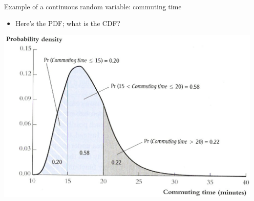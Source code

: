 \documentclass[11pt,english,handout]{beamer}
\begin{document}
\begin{frame}{}
\vspace{0.2cm}
Example of a continuous random variable: commuting time

\begin{itemize}
\item Here's the PDF; what is the CDF?
\end{itemize}

\begin{center}
\includegraphics[scale=0.35]{simple_pdf.png}
\end{center}

\end{frame}
\end{document}
